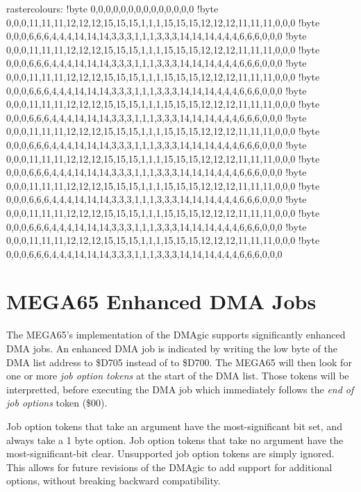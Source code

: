 \begin{screenoutput}
rastercolours:
	!byte 0,0,0,0,0,0,0,0,0,0,0,0,0,0
	!byte 0,0,0,11,11,11,12,12,12,15,15,15,1,1,1,15,15,15,12,12,12,11,11,11,0,0,0
	!byte 0,0,0,6,6,6,4,4,4,14,14,14,3,3,3,1,1,1,3,3,3,14,14,14,4,4,4,6,6,6,0,0,0
	!byte 0,0,0,11,11,11,12,12,12,15,15,15,1,1,1,15,15,15,12,12,12,11,11,11,0,0,0
	!byte 0,0,0,6,6,6,4,4,4,14,14,14,3,3,3,1,1,1,3,3,3,14,14,14,4,4,4,6,6,6,0,0,0
	!byte 0,0,0,11,11,11,12,12,12,15,15,15,1,1,1,15,15,15,12,12,12,11,11,11,0,0,0
	!byte 0,0,0,6,6,6,4,4,4,14,14,14,3,3,3,1,1,1,3,3,3,14,14,14,4,4,4,6,6,6,0,0,0
	!byte 0,0,0,11,11,11,12,12,12,15,15,15,1,1,1,15,15,15,12,12,12,11,11,11,0,0,0
	!byte 0,0,0,6,6,6,4,4,4,14,14,14,3,3,3,1,1,1,3,3,3,14,14,14,4,4,4,6,6,6,0,0,0
	!byte 0,0,0,11,11,11,12,12,12,15,15,15,1,1,1,15,15,15,12,12,12,11,11,11,0,0,0
	!byte 0,0,0,6,6,6,4,4,4,14,14,14,3,3,3,1,1,1,3,3,3,14,14,14,4,4,4,6,6,6,0,0,0
	!byte 0,0,0,11,11,11,12,12,12,15,15,15,1,1,1,15,15,15,12,12,12,11,11,11,0,0,0
	!byte 0,0,0,6,6,6,4,4,4,14,14,14,3,3,3,1,1,1,3,3,3,14,14,14,4,4,4,6,6,6,0,0,0
	!byte 0,0,0,11,11,11,12,12,12,15,15,15,1,1,1,15,15,15,12,12,12,11,11,11,0,0,0
	!byte 0,0,0,6,6,6,4,4,4,14,14,14,3,3,3,1,1,1,3,3,3,14,14,14,4,4,4,6,6,6,0,0,0
	!byte 0,0,0,11,11,11,12,12,12,15,15,15,1,1,1,15,15,15,12,12,12,11,11,11,0,0,0
	!byte 0,0,0,6,6,6,4,4,4,14,14,14,3,3,3,1,1,1,3,3,3,14,14,14,4,4,4,6,6,6,0,0,0
	!byte 0,0,0,11,11,11,12,12,12,15,15,15,1,1,1,15,15,15,12,12,12,11,11,11,0,0,0
	!byte 0,0,0,6,6,6,4,4,4,14,14,14,3,3,3,1,1,1,3,3,3,14,14,14,4,4,4,6,6,6,0,0,0
\end{screenoutput}

\section{MEGA65 Enhanced DMA Jobs}

The MEGA65's implementation of the DMAgic supports significantly
enhanced DMA jobs.  An enhanced DMA job is indicated by writing the
low byte of the DMA list address to \$D705 instead of to \$D700.  The
MEGA65 will then look for one or more {\em job option tokens} at the
start of the DMA list.  Those tokens will be interpretted, before
executing the DMA job which immediately follows the {\em end of job
  options} token (\$00).

Job option tokens that take an argument have the
most-significant bit set, and always take a 1 byte option.  Job option
tokens that take no argument have the most-significant-bit clear.
Unsupported job option tokens are simply ignored.
This allows for future revisions of the DMAgic to add support for
additional options, without breaking backward compatibility.

